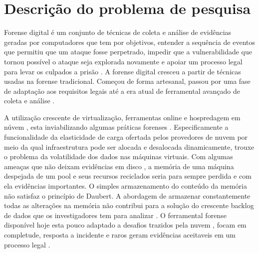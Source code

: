 \documentclass[12pt,				%
	openright,			%
	oneside,			%
	a4paper,			%
	english,			%
	brazil				%
	]{abntex2}
\begin{document}



\textual

\chapter{Descrição do problema de pesquisa} \label{chap:intro}
%
Forense digital é um conjunto de técnicas de coleta e análise de evidências geradas por computadores que tem por objetivos, entender a sequência de eventos que permitiu que um 
ataque fosse perpetrado, impedir que a vulnerabilidade que tornou possível o ataque seja explorada novamente e apoiar um processo legal para levar os culpados a prisão \cite{Sang2013}. 
A forense digital cresceu a partir de técnicas usadas na forense tradicional. Começou de forma artesanal, passou por uma fase de adaptação aos requisitos legais até a era atual
de ferramental avançado de coleta e análise \cite{Charters2008}.

A utilização crescente de virtualização, ferramentas online e hospredagem em núvem \cite{Amazon2016}, esta inviabilizando algumas práticas forenses \cite{Sharma2012}. 
Especificamente a funcionalidade da elasticidade de carga ofertada pelos provedores de nuvem por meio da qual infraestrutura pode ser alocada e desalocada dinamicamente, 
trouxe o problema da volatilidade dos dados nas máquinas virtuais. Com algumas ameaças que não deixam evidências em disco \cite{Rafique2013}, a memória de uma máquina 
despejada de um pool e seus recursos reciclados seria para sempre perdida e com ela evidências importantes. O simples armazenamento do conteúdo da memória não satisfaz 
o princípio de Daubert. A abordagem de armazenar constantemente todas as alterações na memória não contribui para a solução do crescente backlog de dados que os investigadores 
tem para analizar \cite{Quick2014}. O ferramental forense disponível hoje esta pouco adaptado a desafios trazidos pela nuvem \cite{Dykstra2012a}, focam em completude,
resposta a incidente e raros geram evidências aceitaveis em um processo legal \cite{Reichert2015}. \\
\end{document}
